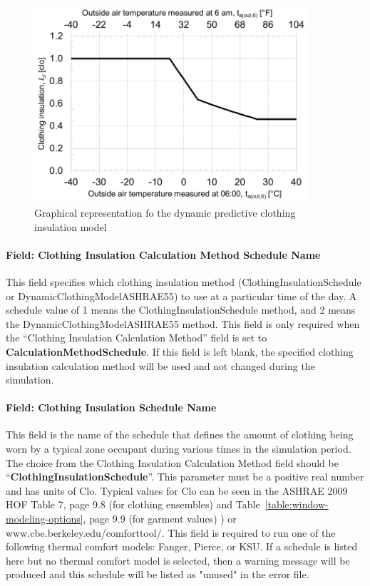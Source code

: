 \begin{figure}[hbtp] %
\centering
\includegraphics[width=0.9\textwidth, height=0.9\textheight, keepaspectratio=true]{media/image083.png}
\caption{Graphical representation fo the dynamic predictive clothing insulation model \protect \label{fig:graphical-representation-fo-the-dynamic}}
\end{figure}

\paragraph{Field: Clothing Insulation Calculation Method Schedule Name}\label{field-clothing-insulation-calculation-method-schedule-name}

This field specifies which clothing insulation method (ClothingInsulationSchedule or DynamicClothingModelASHRAE55) to use at a particular time of the day. A schedule value of 1 means the ClothingInsulationSchedule method, and 2 means the DynamicClothingModelASHRAE55 method. This field is only required when the ``Clothing Insulation Calculation Method'' field is set to \textbf{CalculationMethodSchedule}. If this field is left blank, the specified clothing insulation calculation method will be used and not changed during the simulation.

\paragraph{Field: Clothing Insulation Schedule Name}\label{field-clothing-insulation-schedule-name}

This field is the name of the schedule that defines the amount of clothing being worn by a typical zone occupant during various times in the simulation period. The choice from the Clothing Insulation Calculation Method field should be ``\textbf{ClothingInsulationSchedule}''. This parameter must be a positive real number and has units of Clo. Typical values for Clo can be seen in the ASHRAE 2009 HOF Table 7, page 9.8 (for clothing ensembles) and Table~\ref{table:window-modeling-options}, page 9.9 (for garment values) ) or www.cbe.berkeley.edu/comforttool/. This field is required to run one of the following thermal comfort models: Fanger, Pierce, or KSU. If a schedule is listed here but no thermal comfort model is selected, then a warning message will be produced and this schedule will be listed as "unused" in the error file.

